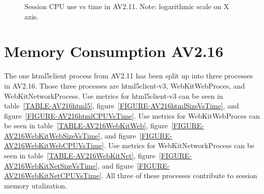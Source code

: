 \documentclass{article}
\begin{document}
\begin{figure}[H]
        \caption{\label{FIGURE-AV211CPUVsTime} Session CPU use vs time in AV2.11. Note: logarithmic scale on X axis.}
\end{figure}



\newpage

\section{Memory Consumption AV2.16}
\label{SECTION-216Memory}

The one html5client process from AV2.11 has been split up into three processes in AV2.16. Those three processes are html5client-v3, WebKitWebProces, and WebKitNetworkProcess. Use metrics for html5client-v3 can be seen in table~\ref{TABLE-AV216html5}, figure~\ref{FIGURE-AV216htmlSizeVsTime}, and figure~\ref{FIGURE-AV216htmlCPUVsTime}. Use metrics for WebKitWebProces can be seen in table~\ref{TABLE-AV216WebKitWeb}, figure~\ref{FIGURE-AV216WebKitWebSizeVsTime}, and figure~\ref{FIGURE-AV216WebKitWebCPUVsTime}. Use metrics for WebKitNetworkProcess can be seen in table~\ref{TABLE-AV216WebKitNet}, figure~\ref{FIGURE-AV216WebKitNetSizeVsTime}, and figure~\ref{FIGURE-AV216WebKitNetCPUVsTime}. All three of these processes contribute to session memory utalization. 
\end{document}
